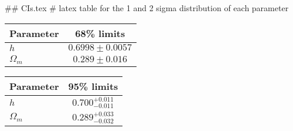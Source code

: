 ## CIs.tex
# latex table for the 1 and 2 sigma distribution of each parameter

\begin{tabular} { l  c}
 Parameter &  68\% limits\\
\hline
{\boldmath$h              $} & $0.6998\pm 0.0057          $\\
{\boldmath$\Omega_m       $} & $0.289\pm 0.016            $\\
\hline
\end{tabular}

\begin{tabular} { l  c}
 Parameter &  95\% limits\\
\hline
{\boldmath$h              $} & $0.700^{+0.011}_{-0.011}   $\\
{\boldmath$\Omega_m       $} & $0.289^{+0.033}_{-0.032}   $\\
\hline
\end{tabular}
